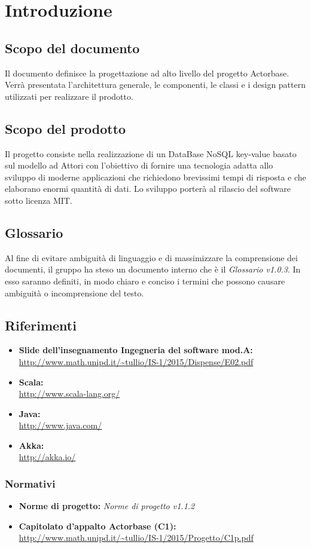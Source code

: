 \documentclass[a4paper]{article}
\begin{document}
	\newpage \section{Introduzione}
	\subsection{Scopo del documento}
		Il documento definisce la progettazione ad alto livello del progetto Actorbase.
		Verrà presentata l'architettura generale, le componenti, le classi e i design pattern utilizzati per realizzare il prodotto.
	\subsection{Scopo del prodotto}
		Il progetto consiste nella realizzazione di un DataBase NoSQL key-value basato sul modello ad 
		Attori con l'obiettivo di fornire una tecnologia adatta allo sviluppo di moderne 
		applicazioni che richiedono brevissimi tempi di risposta e che elaborano enormi quantità 
		di dati. Lo sviluppo porterà al rilascio del software sotto licenza MIT.
	\subsection{Glossario}
		Al fine di evitare ambiguità di linguaggio e di massimizzare la comprensione dei documenti, il 
      gruppo ha steso un documento interno che è il \emph{Glossario v1.0.3}. In esso saranno definiti, in modo
      chiaro e conciso i termini che possono causare ambiguità o incomprensione del testo.
	\subsection{Riferimenti}
		\begin{itemize}
			\item \textbf{Slide dell'insegnamento Ingegneria del software mod.A:} \\
			\url{http://www.math.unipd.it/~tullio/IS-1/2015/Dispense/E02.pdf}
			\item \textbf{Scala:} \\
			\url{http://www.scala-lang.org/}
			\item \textbf{Java:} \\
			\url{http://www.java.com/}
			\item \textbf{Akka:} \\
			\url{http://akka.io/}
		\end{itemize}
	\subsubsection{Normativi}
		\begin{itemize}
			\item \textbf{Norme di progetto:} \emph{Norme di progetto v1.1.2}
			\item \textbf{Capitolato d'appalto Actorbase (C1):} \\ 
			\url{http://www.math.unipd.it/~tullio/IS-1/2015/Progetto/C1p.pdf}
		\end{itemize}
		
\end{document}
